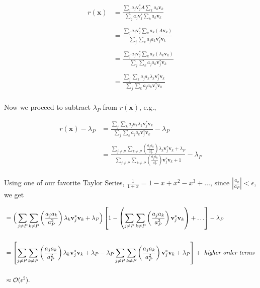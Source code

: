 \documentclass[paper=a4, fontsize=11pt]{scrartcl} %
\numberwithin{equation}{section} %
\numberwithin{figure}{section} %
\numberwithin{table}{section} %
\begin{document}
\begin{align*}
r(\textbf{x} )&= \frac{  \sum_j a_j \textbf{v}_j^{*} A  \sum_k a_k \textbf{v}_k   }{  \sum_j a_j \textbf{v}_j^{*} \sum_k a_k \textbf{v}_k   } \\ \\
	&= \frac{ \sum_j a_j \textbf{v}_j^{*} \sum_k a_k (A \textbf{v}_k)   }{  \sum_j \sum_k a_j a_k \textbf{v}_j^{*} \textbf{v}_k   } \\ \\
	&=  \frac{ \sum_j a_j \textbf{v}_j^{*} \sum_k a_k ( \lambda_k \textbf{v}_k )  }{  \sum_j \sum_k a_j a_k \textbf{v}_j^{*} \textbf{v}_k   } \\ \\
	&= \frac{   \sum_j \sum_k a_j a_k \lambda_k \textbf{v}_j^{*} \textbf{v}_k     }{   \sum_j \sum_k a_j a_k \textbf{v}_j^{*} \textbf{v}_k        } \\ 
\end{align*}

Now we proceed to subtract $\lambda_P$ from $r(\textbf{x})$, e.g., 

\begin{align*}
r(\textbf{x}) - \lambda_P &= \frac{   \sum_j \sum_k a_j a_k \lambda_k \textbf{v}_j^{*} \textbf{v}_k     }{   \sum_j \sum_k a_j a_k \textbf{v}_j^{*} \textbf{v}_k        } - \lambda_P \\ \\
	&= \frac{ \sum_{j\neq P} \sum_{k\neq P} \left( \frac{a_ja_k}{a_P^2} \right) \lambda_k \textbf{v}_j^{*}\textbf{v}_k + \lambda_P     }{  \sum_{j\neq P} \sum_{k\neq P} \left( \frac{a_ja_k}{a_P^2} \right) \textbf{v}_j^{*}\textbf{v}_k + 1  } - \lambda_P \\ 
\end{align*}

Using one of our favorite Taylor Series, $\frac{1}{1+x} = 1-x+x^2-x^3+\ldots$, since $\left| \frac{a_k}{a_P}  \right| < \epsilon$, we get

\begin{align*}
	&= \Big( \sum_{j\neq P} \sum_{k\neq P} \left( \frac{a_ja_k}{a_P^2} \right) \lambda_k \textbf{v}_j^{*}\textbf{v}_k + \lambda_P   \Big) \left[  1 - \left( \sum_{j\neq P} \sum_{k\neq P} \left( \frac{a_ja_k}{a_P^2} \right) \textbf{v}_j^{*}\textbf{v}_k   \right) +  \ldots  \right] - \lambda_P \\ \\
	&= \left[  \sum_{j\neq P} \sum_{k\neq P} \left( \frac{a_ja_k}{a_P^2} \right) \lambda_k \textbf{v}_j^{*}\textbf{v}_k + \lambda_P - \lambda_P \sum_{j\neq P} \sum_{k\neq P} \left( \frac{a_ja_k}{a_P^2} \right)  \textbf{v}_j^{*}\textbf{v}_k + \lambda_P    \right] + \mbox{ \emph{higher order terms} } \\ \\
	&\approx \mathcal{O}(\epsilon^2). \\
\end{align*}
\end{document}
